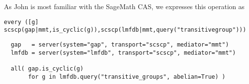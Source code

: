 As John is most familiar with the SageMath CAS, we expresses this operation as
\begin{lstlisting}
every ([g] scscp(gap|mmt,is_cyclic(g)),scscp(lmfdb|mmt,query("transitivegroup"))) 
\end{lstlisting}


\begin{lstlisting}
  gap   = server(system="gap", transport="scscp", mediator="mmt")
  lmfdb = server(system="lmfdb", transport="scscp", mediator="mmt")

  all( gap.is_cyclic(g)
       for g in lmfdb.query("transitive_groups", abelian=True) )
\end{lstlisting}

